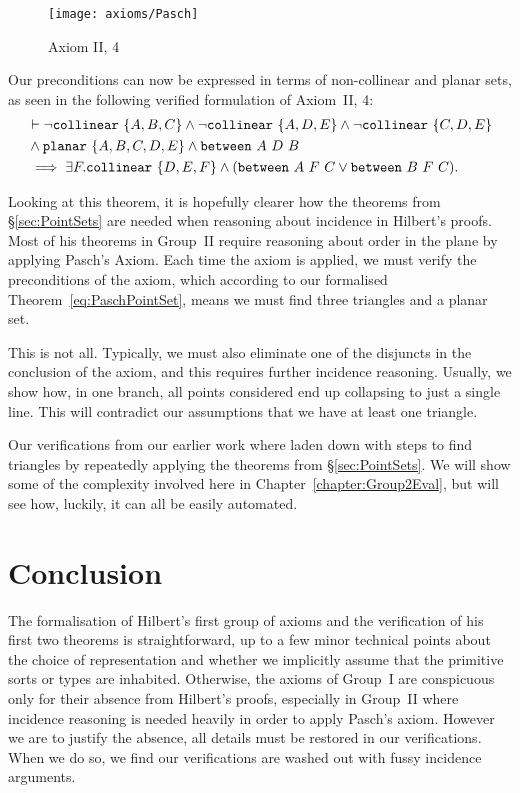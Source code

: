 \begin{figure}
\centering\texttt{[image: axioms/Pasch]}
\caption{Axiom II, 4}
\label{fig:PaschDiagram}
\end{figure}

Our preconditions can now be expressed in terms of non-collinear and planar sets, as seen in the following verified formulation of Axiom~II, 4:%
\begin{align}\label{eq:PaschPointSet}
  &\vdash\neg\code{collinear}\ \{A,B,C\}\wedge\neg\code{collinear}\ \{A,D,E\}\wedge\neg\code{collinear}\ \{C,D,E\}\\
  &\wedge\code{planar}\ \{A,B,C,D,E\}\wedge\between{A}{D}{B}\notag\\
  &\implies\exists F. \code{collinear}\ \{D,E,F\} \wedge (\between{A}{F}{C}\vee\between{B}{F}{C}).\notag
\end{align}

Looking at this theorem, it is hopefully clearer how the theorems from \S\ref{sec:PointSets} are needed when reasoning about incidence in Hilbert's proofs. Most of his theorems in Group~II require reasoning about order in the plane by applying Pasch's Axiom. Each time the axiom is applied, we must verify the preconditions of the axiom, which according to our formalised Theorem~\ref{eq:PaschPointSet}, means we must find three triangles and a planar set.

This is not all. Typically, we must also eliminate one of the disjuncts in the conclusion of the axiom, and this requires further incidence reasoning. Usually, we show how, in one branch, all points considered end up collapsing to just a single line. This will contradict our assumptions that we have at least one triangle.

Our verifications from our earlier work where laden down with steps to find triangles by repeatedly applying the theorems from \S\ref{sec:PointSets}. We will show some of the complexity involved here in Chapter~\ref{chapter:Group2Eval}, but will see how, luckily, it can all be easily automated.

\section{Conclusion}
The formalisation of Hilbert's first group of axioms and the verification of his first two theorems is straightforward, up to a few minor technical points about the choice of representation and whether we implicitly assume that the primitive sorts or types are inhabited. Otherwise, the axioms of Group~I are conspicuous only for their absence from Hilbert's proofs, especially in Group~II where incidence reasoning is needed heavily in order to apply Pasch's axiom. However we are to justify the absence, all details must be restored in our verifications. When we do so, we find our verifications are washed out with fussy incidence arguments.

